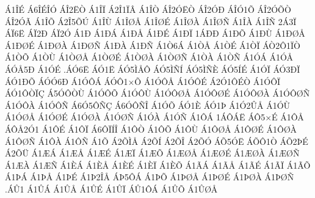 {^^c11^^ce^^c9
^^c16^^ce^^c9^^ce^^d3
^^c1^^ce2^^cb^^d2
^^c11^^ce^^cf
^^c12^^ce1^^cf^^c2
^^c11^^ce^^d2
^^c1^^ce2^^d3^^cb^^d2
^^c1^^ce2^^d3^^d0
^^c1^^ce^^d31^^d5
^^c1^^ce2^^d3^^d5^^d2
^^c1^^ce2^^d3^^c3
^^c11^^ce^^d5
^^c12^^ce5^^d5^^da
^^c11^^ce^^d9
^^c11^^ce^^d8^^c5
^^c11^^ce^^d8^^c9
^^c11^^ce^^d8^^c0
^^c11^^ce^^d8^^d1
^^c11^^ce^^c0
^^c11^^ce^^d1
2^^c13^^cf
^^c1^^cf6^^cb
^^c1^^cf2^^d0
^^c1^^cf2^^d3
^^c11^^d0
^^c11^^d0^^c1
^^c11^^d0^^c5
^^c11^^d0^^c9
^^c11^^d0^^cf
1^^c1^^d0^^d0
^^c11^^d0^^d5
^^c11^^d0^^d9
^^c11^^d0^^d8^^c5
^^c11^^d0^^d8^^c9
^^c11^^d0^^d8^^c0
^^c11^^d0^^d8^^d1
^^c11^^d0^^c0
^^c11^^d0^^d1
^^c11^^d26^^c1
^^c11^^d2^^c5
^^c11^^d2^^c9
^^c11^^d2^^cf
^^c1^^d22^^d41^^cf^^d2
^^c11^^d2^^d5
^^c11^^d2^^d9
^^c11^^d2^^d8^^c5
^^c11^^d2^^d8^^c9
^^c11^^d2^^d8^^c0
^^c11^^d2^^d8^^d1
^^c11^^d2^^c0
^^c11^^d2^^d1
^^c11^^d3^^c1
^^c11^^d3^^c5
^^c1^^d3^^c55^^d0
^^c11^^d3^^c9
.^^c1^^d36^^cb
^^c1^^d31^^cb
^^c1^^d35^^cc^^c5^^d4
^^c1^^d35^^cc^^d1^^cd
^^c1^^d35^^cc^^d1^^c8
^^c1^^d35^^cd^^c9
^^c11^^d3^^cf
^^c1^^d33^^d0^^cf
^^c1^^d31^^d0^^d5
^^c1^^d3^^d36^^d0
^^c11^^d3^^d4^^c1
^^c1^^d3^^d41^^d7^^d5
^^c11^^d3^^d4^^c5
^^c11^^d3^^d4^^c9
^^c12^^d31^^d4^^c9^^d2
^^c11^^d3^^d4^^cf
^^c1^^d31^^d4^^d2^^cf^^c7
^^c15^^d3^^d4^^d2^^d9
^^c11^^d3^^d4^^d5
^^c11^^d3^^d4^^d9
^^c11^^d3^^d4^^d8^^c5
^^c11^^d3^^d4^^d8^^c9
^^c11^^d3^^d4^^d8^^c0
^^c11^^d3^^d4^^d8^^d1
^^c11^^d3^^d4^^c0
^^c11^^d3^^d4^^d1
^^c16^^d35^^d4^^d1^^c7
^^c16^^d3^^d4^^d1^^ce
^^c11^^d3^^d5
^^c1^^d31^^c8
^^c1^^d31^^de
^^c11^^d32^^db^^c5
^^c11^^d3^^d9
^^c11^^d3^^d8^^c5
^^c11^^d3^^d8^^c9
^^c11^^d3^^d8^^c0
^^c11^^d3^^d8^^d1
^^c11^^d3^^c0
^^c11^^d3^^d1
^^c11^^d4^^c1
1^^c1^^d4^^c1^^cb
^^c1^^d45^^d7^^c9
^^c11^^d4^^c5
^^c1^^d4^^c52^^d31
^^c11^^d4^^c9
^^c11^^d4^^cf
^^c16^^d4^^cf^^cd^^ce
^^c11^^d4^^d2
^^c11^^d4^^d5
^^c11^^d4^^d9
^^c11^^d4^^d8^^c5
^^c11^^d4^^d8^^c9
^^c11^^d4^^d8^^c0
^^c11^^d4^^d8^^d1
^^c11^^d4^^c0
^^c11^^d4^^d1
^^c11^^d5
^^c12^^d5^^cc^^c5
^^c12^^d5^^cd
^^c12^^d5^^ce
^^c12^^d5^^d3
^^c1^^d55^^d3^^cb
^^c1^^d5^^d41^^d2
^^c1^^d52^^de^^c9
^^c12^^d5^^dc
^^c11^^c6^^c1
^^c11^^c6^^c5
^^c11^^c6^^c9
^^c11^^c6^^cf
^^c11^^c6^^d5
^^c11^^c6^^d8^^c5
^^c11^^c6^^d8^^c9
^^c11^^c6^^d8^^c0
^^c11^^c6^^d8^^d1
^^c11^^c6^^c0
^^c11^^c6^^d1
^^c11^^c8^^c1
^^c11^^c8^^c5
^^c11^^c8^^c9
^^c11^^c8^^cf
^^c11^^c8^^d5
^^c11^^c3^^c1
^^c11^^c3^^c5
^^c11^^c3^^c9
^^c11^^c3^^cf
^^c11^^c3^^d5
^^c11^^de^^c1
^^c11^^de^^c5
^^c11^^de^^c9
^^c11^^de2^^ce^^c5
^^c1^^de5^^d4^^c1
^^c11^^de^^d5
^^c11^^de^^d8^^c5
^^c11^^de^^d8^^c9
^^c11^^de^^d8^^c0
^^c11^^de^^d8^^d1
.^^c1^^db1
^^c11^^db^^c1
^^c11^^db^^c5
^^c11^^db^^c9
^^c11^^db^^cf
^^c1^^db1^^d4^^c1
^^c11^^db^^d5
^^c11^^db^^d8^^c5
}
